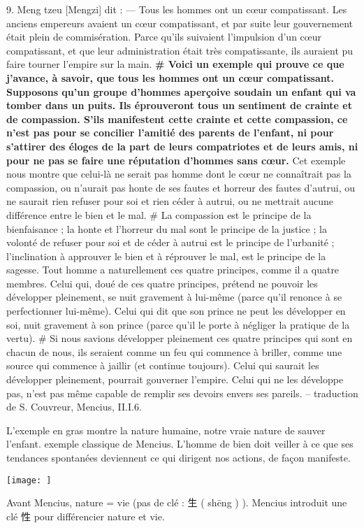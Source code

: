 \begin{singlequote}
  9.	Meng tzeu [Mengzi] dit :
—	Tous les hommes ont un cœur compatissant. Les anciens empereurs avaient un cœur compatissant, et par suite leur gouvernement était plein de commisération. Parce qu’ils suivaient l’impulsion d’un cœur compatissant, et que leur administration était très compatissante, ils auraient pu faire tourner l’empire sur la main.
\textbf{# Voici un exemple qui prouve ce que j’avance, à savoir, que tous les hommes ont un cœur compatissant. Supposons qu’un groupe d’hommes aperçoive soudain un enfant qui va tomber dans un puits. Ils éprouveront tous un sentiment de crainte et de compassion. S’ils manifestent cette crainte et cette compassion, ce n’est pas pour se concilier l’amitié des parents de l’enfant, ni pour s’attirer des éloges de la part de leurs compatriotes et de leurs amis, ni pour ne pas se faire une réputation d’hommes sans cœur.}
Cet exemple nous montre que celui-là ne serait pas homme dont le cœur ne connaîtrait pas la compassion, ou n’aurait pas honte de ses fautes et horreur des fautes d’autrui, ou ne saurait rien refuser pour soi et rien céder à autrui, ou ne mettrait aucune différence entre le bien et le mal. # La compassion est le principe de la bienfaisance ; la honte et l’horreur du mal sont le principe de la justice ; la volonté de refuser pour soi et de céder à autrui est le principe de l’urbanité ; l’inclination à approuver le bien et à réprouver le mal, est le principe de la sagesse. Tout homme a naturellement ces quatre principes, comme il a quatre membres. Celui qui, doué de ces quatre principes, prétend ne pouvoir les développer pleinement, se nuit gravement à lui-même (parce qu’il renonce à se perfectionner lui-même). Celui qui dit que son prince ne peut les développer en soi, nuit gravement à son prince (parce qu’il le porte à négliger la pratique de la vertu).
# Si nous savions développer pleinement ces quatre principes qui sont en chacun de nous, ils seraient comme un feu qui commence à briller, comme une source qui commence à jaillir (et continue toujours). Celui qui saurait les développer pleinement, pourrait gouverner l’empire. Celui qui ne les développe pas, n’est pas même capable de remplir ses devoirs envers ses pareils.
-- traduction de S. Couvreur, Mencius, II.I.6.  
\end{singlequote}



 
L'exemple en gras montre la nature humaine, notre vraie nature de sauver l'enfant. exemple classique de Mencius.
L'homme de bien doit veiller à ce que ses tendances spontanées deviennent ce qui dirigent nos actions, de façon manifeste. 
\begin{marginfigure}
    \texttt{[image: ]}
\end{marginfigure}
\begin{Def}[Xing 性 vs 生]
    Avant Mencius, nature = vie (pas de clé : 生 ( shēng ) ). Mencius introduit une clé  性 pour différencier nature et vie.
\end{Def}

